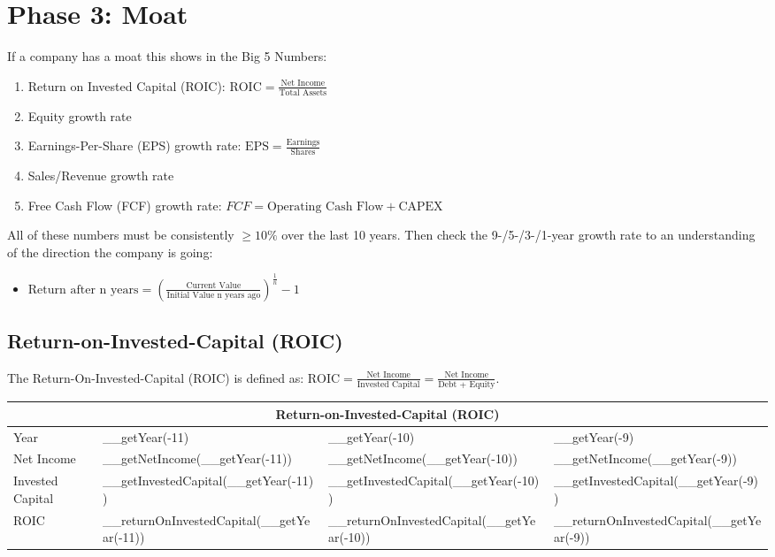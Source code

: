 \section{Phase 3: Moat}
If a company has a moat this shows in the Big 5 Numbers:
\begin{enumerate}
	\item Return on Invested Capital (ROIC): $\text{ROIC} = \frac{\text{Net Income}}{\text{Total Assets}}$
	\item Equity growth rate
	\item Earnings-Per-Share (EPS) growth rate: $\text{EPS} = \frac{\text{Earnings}}{\text{Shares}}$
	\item Sales/Revenue growth rate
	\item Free Cash Flow (FCF) growth rate: $FCF = \text{Operating Cash Flow} + \text{CAPEX}$
\end{enumerate}
All of these numbers must be consistently $\geq 10\%$ over the last 10 years. Then
check the 9-/5-/3-/1-year growth rate to an understanding of the direction the
company is going:
\begin{itemize}
	\item $\text{Return after n years} = (\frac{\text{Current Value}}{\text{Initial Value n years ago}})^{\frac{1}{n}} - 1$
\end{itemize}

\subsection{Return-on-Invested-Capital (ROIC)}

The Return-On-Invested-Capital (ROIC) is defined as: $\text{ROIC} = \frac{\text{Net Income}}{\text{Invested Capital}} = \frac{\text{Net Income}}{\text{Debt + Equity}}$.\\

\begin{tabularx}{\textwidth}{|X|X|X|X|}
 \hline
 \multicolumn{4}{|c|}{Return-on-Invested-Capital (ROIC)} \\
 \hline
 Year                      & __getYear(-11)                            & __getYear(-10)                            & __getYear(-9)                            \\
 \hline
 Net Income                & __getNetIncome(__getYear(-11))            & __getNetIncome(__getYear(-10))            & __getNetIncome(__getYear(-9))            \\
 Invested Capital          & __getInvestedCapital(__getYear(-11))      & __getInvestedCapital(__getYear(-10))      & __getInvestedCapital(__getYear(-9))      \\
 \rowcolor{lightgray} ROIC & __returnOnInvestedCapital(__getYear(-11)) & __returnOnInvestedCapital(__getYear(-10)) & __returnOnInvestedCapital(__getYear(-9)) \\
 \hline
\end{tabularx}\\

